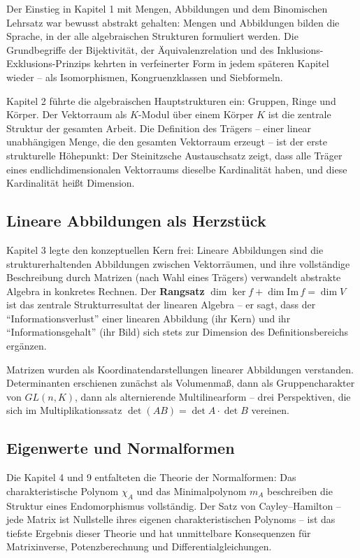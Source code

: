 ﻿\documentclass[a4paper,12pt]{report}
\theoremstyle{definition}
\begin{document}
Der Einstieg in Kapitel 1 mit Mengen, Abbildungen und dem Binomischen
Lehrsatz war bewusst abstrakt gehalten: Mengen und Abbildungen bilden
die Sprache, in der alle algebraischen Strukturen formuliert werden.
Die Grundbegriffe der Bijektivität, der Äquivalenzrelation und des
Inklusions-Exklusions-Prinzips kehrten in verfeinerter Form in
jedem späteren Kapitel wieder -- als Isomorphismen, Kongruenzklassen
und Siebformeln.

Kapitel 2 führte die algebraischen Hauptstrukturen ein: Gruppen,
Ringe und Körper. Der Vektorraum als $K$-Modul über einem Körper $K$
ist die zentrale Struktur der gesamten Arbeit. Die Definition des
Trägers -- einer linear unabhängigen Menge, die den gesamten
Vektorraum erzeugt -- ist der erste strukturelle Höhepunkt:
Der Steinitzsche Austauschsatz zeigt, dass alle Träger eines
endlichdimensionalen Vektorraums dieselbe Kardinalität haben,
und diese Kardinalität heißt Dimension.

\subsection*{Lineare Abbildungen als Herzstück}

Kapitel 3 legte den konzeptuellen Kern frei: Lineare Abbildungen
sind die strukturerhaltenden Abbildungen zwischen Vektorräumen,
und ihre vollständige Beschreibung durch Matrizen (nach Wahl eines
Trägers) verwandelt abstrakte Algebra in konkretes Rechnen.
Der \textbf{Rangsatz} $\dim\ker f + \dim\mathrm{Im}\,f = \dim V$
ist das zentrale Strukturresultat der linearen Algebra -- er sagt,
dass der ``Informationsverlust'' einer linearen Abbildung (ihr Kern)
und ihr ``Informationsgehalt'' (ihr Bild) sich stets zur Dimension
des Definitionsbereichs ergänzen.

Matrizen wurden als Koordinatendarstellungen linearer Abbildungen
verstanden. Determinanten erschienen zunächst als Volumenmaß,
dann als Gruppencharakter von $GL(n,K)$, dann als alternierende
Multilinearform -- drei Perspektiven, die sich im Multiplikationssatz
$\det(AB) = \det A \cdot \det B$ vereinen.

\subsection*{Eigenwerte und Normalformen}

Die Kapitel 4 und 9 entfalteten die Theorie der Normalformen:
Das charakteristische Polynom $\chi_A$ und das Minimalpolynom $m_A$
beschreiben die Struktur eines Endomorphismus vollständig.
Der Satz von Cayley--Hamilton -- jede Matrix ist Nullstelle ihres
eigenen charakteristischen Polynoms -- ist das tiefste Ergebnis
dieser Theorie und hat unmittelbare Konsequenzen für
Matrixinverse, Potenzberechnung und Differentialgleichungen.
\end{document}
